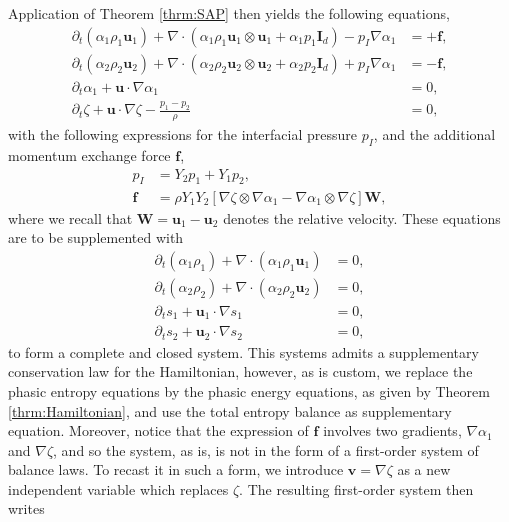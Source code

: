 \documentclass{myclass}
\newcommand{\Id}{\mathbf{I}_d}
\newcommand{\vel}{\bm{u}}
\newcommand{\lift}{\bm{f}}
\newcommand{\pth}[1]  {\left( #1 \right)}
\newcommand{\brck}[1]  {\left[ #1 \right]}
\begin{document}
Application of Theorem \ref{thrm:SAP} then yields the following equations,
\begin{subequations}
\begin{align}\label{sys:phasic_momentum_vol_frac_zeta}
\partial_t\pth{\alpha_1\rho_1\vel_1} + \nabla\cdot\pth{\alpha_1\rho_1\vel_1\otimes\vel_1 + \alpha_1 p_1\Id} - p_I\nabla\alpha_1 &=+\lift,\\
\partial_t\pth{\alpha_2\rho_2\vel_2} + \nabla\cdot\pth{\alpha_2\rho_2\vel_2\otimes\vel_2 + \alpha_2 p_2\Id} + p_I\nabla\alpha_1 &=-\lift,\\
\partial_t\alpha_1 + \vel\cdot\nabla\alpha_1 &=0,\\
\partial_t \zeta + \vel\cdot\nabla\zeta -\frac{p_1-p_2}{\rho} &=0, \label{eq:SAP_zeta_eq}
\end{align}
\end{subequations}
with the following expressions for the interfacial pressure $p_I$, and the additional momentum exchange force $\lift$,
\begin{subequations}
\begin{align}
p_I &= Y_2 p_1 + Y_1 p_2,\label{eq:interfacial_pressure}\\
\lift &= \rho Y_1 Y_2 \brck{\nabla\zeta\otimes\nabla\alpha_1 - \nabla\alpha_1\otimes\nabla\zeta}\bm{W},
\end{align}
\end{subequations}
where we recall that $\bm{W}=\vel_1-\vel_2$ denotes the relative velocity. These equations are to be supplemented with
\begin{subequations}
\begin{align}\label{sys:mass_entropy_constraints}
\partial_t \pth{\alpha_1\rho_1} + \nabla\cdot\pth{\alpha_1\rho_1 \vel_1} &=0,\\
\partial_t \pth{\alpha_2\rho_2} + \nabla\cdot\pth{\alpha_2\rho_2 \vel_2} &=0,\\
\partial_t s_1 + \vel_1\cdot\nabla s_1 &=0,\\
\partial_t s_2 + \vel_2\cdot\nabla s_2 &=0,
\end{align}
\end{subequations}
to form a complete and closed system. This systems admits a supplementary conservation law for the Hamiltonian, however, as is custom, we replace the phasic entropy equations by the phasic energy equations, as given by Theorem \ref{thrm:Hamiltonian}, and use the total entropy balance as supplementary equation. Moreover, notice that the expression of $\lift$ involves two gradients, $\nabla\alpha_1$ and $\nabla\zeta$, and so the system, as is, is not in the form of a first-order system of balance laws. To recast it in such a form, we introduce $\bm{v}=\nabla\zeta$ as a new independent variable which replaces $\zeta$. The resulting first-order system then writes
\end{document}
